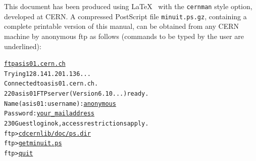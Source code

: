 This document has been produced using \LaTeX~\cite{bib-LATEX} with the
\texttt{cernman} style option, developed at CERN.  A compressed
PostScript file \texttt{minuit.ps.gz}, containing a complete printable
version of this manual, can be obtained from any CERN machine by
anonymous ftp as follows (commands to be typed by the user are
underlined):

\vspace*{3mm} 
\begin{alltt}\footnotesize
    \underline{ftp asis01.cern.ch}
    Trying 128.141.201.136...
    Connected to asis01.cern.ch.
    220 asis01 FTP server (Version 6.10 ...) ready.
    Name (asis01:username): \underline{anonymous}
    Password: \underline{your\_{}mailaddress}
    230 Guest login ok, access restrictions apply.
    ftp> \underline{cd cernlib/doc/ps.dir}
    ftp> \underline{get minuit.ps}
    ftp> \underline{quit}
\end{alltt}


\newpage
\tableofcontents
\listoffigures
\listoftables
